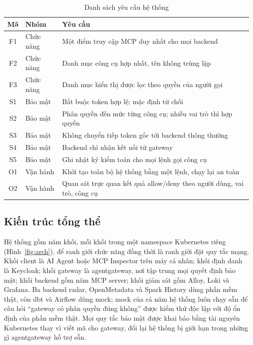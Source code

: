 \documentclass[a4paper]{article}
\begin{document}
\begin{table}[H]\centering\caption{Danh sách yêu cầu hệ thống}\label{tab:yeucau}
{\singlespacing\renewcommand{\arraystretch}{1.2}
\begin{tabularx}{\textwidth}{|c|p{2.6cm}|X|}\hline
\textbf{Mã} & \textbf{Nhóm} & \textbf{Yêu cầu} \\ \hline
F1 & Chức năng & Một điểm truy cập MCP duy nhất cho mọi backend \\ \hline
F2 & Chức năng & Danh mục công cụ hợp nhất, tên không trùng lặp \\ \hline
F3 & Chức năng & Danh mục hiển thị được lọc theo quyền của người gọi \\ \hline
S1 & Bảo mật & Bắt buộc token hợp lệ; mặc định từ chối \\ \hline
S2 & Bảo mật & Phân quyền đến mức từng công cụ; nhiều vai trò thì hợp quyền \\ \hline
S3 & Bảo mật & Không chuyển tiếp token gốc tới backend thông thường \\ \hline
S4 & Bảo mật & Backend chỉ nhận kết nối từ gateway \\ \hline
S5 & Bảo mật & Ghi nhật ký kiểm toán cho mọi lệnh gọi công cụ \\ \hline
O1 & Vận hành & Khởi tạo toàn bộ hệ thống bằng một lệnh, chạy lại an toàn \\ \hline
O2 & Vận hành & Quan sát trực quan kết quả allow/deny theo người dùng, vai trò, công cụ \\ \hline
\end{tabularx}}\end{table}

\subsection{Kiến trúc tổng thể}

Hệ thống gồm năm khối, mỗi khối trong một namespace Kubernetes riêng (Hình~\ref{fig:arch}), để ranh giới chức năng đồng thời là ranh giới đặt quy tắc mạng. Khối client là AI Agent hoặc MCP Inspector trên máy cá nhân; khối định danh là Keycloak; khối gateway là agentgateway, nơi tập trung mọi quyết định bảo mật; khối backend gồm năm MCP server; khối giám sát gồm Alloy, Loki và Grafana. Ba backend radar, OpenMetadata và Spark History dùng phần mềm thật, còn dbt và Airflow dùng mock; mock của cả năm hệ thống luôn chạy sẵn để câu hỏi ``gateway có phân quyền đúng không'' được kiểm thử độc lập với độ ổn định của phần mềm thật. Mọi quy tắc bảo mật được khai báo bằng tài nguyên Kubernetes thay vì viết mã cho gateway, đổi lại hệ thống bị giới hạn trong những gì agentgateway hỗ trợ sẵn.
\end{document}
